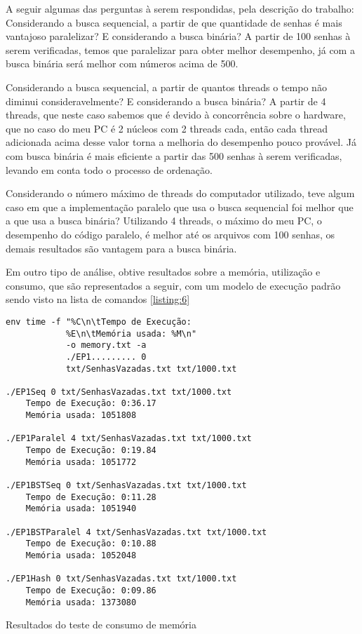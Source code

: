 \documentclass[10pt,journal,compsoc]{IEEEtran}
\begin{document}
A seguir algumas das perguntas à serem respondidas, pela descrição do trabalho:
Considerando a busca sequencial, a partir de que quantidade de senhas é mais vantajoso paralelizar? E considerando a busca binária?
A partir de 100 senhas à serem verificadas, temos que paralelizar para obter melhor desempenho, já com a busca binária será melhor com números acima de 500. 

Considerando a busca sequencial, a partir de quantos threads o tempo não diminui consideravelmente? E considerando a busca binária?
A partir de 4 threads, que neste caso sabemos que é devido à concorrência sobre o hardware, que no caso do meu PC é 2 núcleos com 2 threads cada, então cada thread adicionada acima desse valor torna a melhoria do desempenho pouco provável. Já com busca binária é mais eficiente a partir das 500 senhas à serem verificadas, levando em conta todo o processo de ordenação.

Considerando o número máximo de threads do computador utilizado, teve algum caso em que a implementação paralelo que usa o busca sequencial foi melhor que a que usa a busca binária?
Utilizando 4 threads, o máximo do meu PC, o desempenho do código paralelo, é melhor até os arquivos com 100 senhas, os demais resultados são vantagem para a busca binária.
	
Em outro tipo de análise, obtive resultados sobre a memória, utilização e consumo, que são representados a seguir, com um modelo de execução padrão sendo visto na lista de comandos \ref{listing:6}

\begin{listing}[ht]
\begin{verbatim}
env time -f "%C\n\tTempo de Execução:
            %E\n\tMemória usada: %M\n"
            -o memory.txt -a 
            ./EP1......... 0 
            txt/SenhasVazadas.txt txt/1000.txt

./EP1Seq 0 txt/SenhasVazadas.txt txt/1000.txt
    Tempo de Execução: 0:36.17
    Memória usada: 1051808

./EP1Paralel 4 txt/SenhasVazadas.txt txt/1000.txt
    Tempo de Execução: 0:19.84
    Memória usada: 1051772

./EP1BSTSeq 0 txt/SenhasVazadas.txt txt/1000.txt
    Tempo de Execução: 0:11.28
    Memória usada: 1051940

./EP1BSTParalel 4 txt/SenhasVazadas.txt txt/1000.txt
    Tempo de Execução: 0:10.88
    Memória usada: 1052048

./EP1Hash 0 txt/SenhasVazadas.txt txt/1000.txt
    Tempo de Execução: 0:09.86
    Memória usada: 1373080

\end{verbatim}
\caption{Resultados do teste de consumo de memória}
\label{listing:6}
\end{listing}
\end{document}

